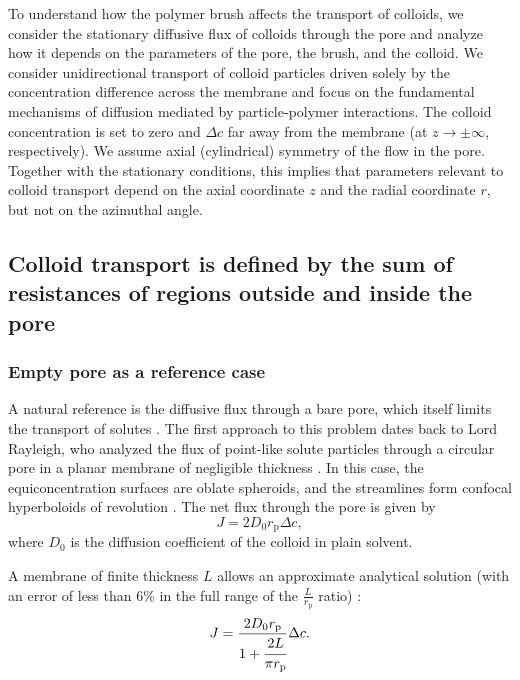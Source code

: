 \documentclass[12pt, a4paper]{article}
\begin{document}
To understand how the polymer brush affects the transport of colloids, we consider the stationary diffusive flux of colloids through the pore and analyze how it depends on the parameters of the pore, the brush, and the colloid.
We consider unidirectional transport of colloid particles driven solely by the concentration difference across the membrane and focus on the fundamental mechanisms of diffusion mediated by particle-polymer interactions.
The colloid concentration is set to zero and $\Delta c$ far away from the membrane (at $z\rightarrow\pm\infty$, respectively).
We assume axial (cylindrical) symmetry of the flow in the pore.
Together with the stationary conditions, this implies that parameters relevant to colloid transport depend on the axial coordinate $z$ and the radial coordinate $r$, but not on the azimuthal angle.


\subsection{Colloid transport is defined by the sum of resistances of regions outside and inside the pore}

\subsubsection{Empty pore as a reference case}

A natural reference is the diffusive flux through a bare pore, which itself limits the transport of solutes \cite{Deen1987, Sun2024}.
The first approach to this problem dates back to Lord Rayleigh, who analyzed the flux of point-like solute particles through a circular pore in a planar membrane of negligible thickness \cite{Strutt1878}.
In this case, the equiconcentration surfaces are oblate spheroids, and the streamlines form confocal hyperboloids of revolution \cite{Cooke1966}.
The net flux through the pore is given by
\begin{equation}
    J=2D_0r_{\text{p}}\Delta c,
    \label{eq:flux_Ral}
\end{equation}
where $D_0$ is the diffusion coefficient of the colloid in plain solvent.

A membrane of finite thickness $L$ allows an approximate analytical solution (with an error of less than 6\% in the full range of the $\frac{L}{r_{\text{p}}}$ ratio) \cite{Brunn1984}:
\begin{equation}
    J=\frac{2 D_0 r_{\text{p}}}{1+\cfrac{2L}{\pi r_{\text{p}}}}\Delta c.
    \label{eq:flux_finlength}
\end{equation}
\end{document}
